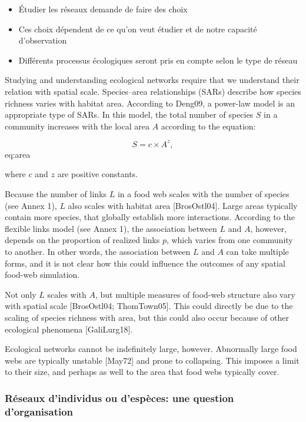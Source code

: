\begin{itemize}
    \item Étudier les réseaux demande de faire des choix 
    \item Ces choix dépendent de ce qu'on veut étudier et de notre capacité d'observation
    \item Différents processus écologiques seront pris en compte selon le type de réseau
\end{itemize}

Studying and understanding
ecological networks require that we understand their relation with spatial
scale.  Species–area relationships (SARs) describe how species richness varies
with habitat area. According to Deng09, a power-law model is an appropriate
type of SARs. In this model, the total number of species $S$ in a community
increases with the local area $A$ according to the equation:

$$ S = c \times A^z, $$ {eq:area}



where $c$ and $z$ are positive constants.

Because the number of links $L$ in a food web scales with the number of species
(see Annex 1), $L$ also scales with habitat area [BrosOstl04]. Large areas
typically contain more species, that globally establish more interactions.
According to the flexible links model (see Annex 1), the association between $L$
and $A$, however, depends on the proportion of realized links $p$, which varies
from one community to another. In other words, the association between $L$ and
$A$ can take multiple forms, and it is not clear how this could influence the
outcomes of any spatial food-web simulation.

Not only $L$ scales with $A$, but multiple measures of food-web structure also
vary with spatial scale [BrosOstl04; ThomTown05]. This could directly be due
to the scaling of species richness with area, but this could also occur because
of other ecological phenomena [GaliLurg18].

Ecological networks cannot be indefinitely large, however. Abnormally large food
webs are typically unstable [May72] and prone to collapsing. This
imposes a limit to their size, and perhaps as well to the area that food webs
typically cover.

\subsubsection{Réseaux d'individus ou d'espèces: une question d'organisation} 

